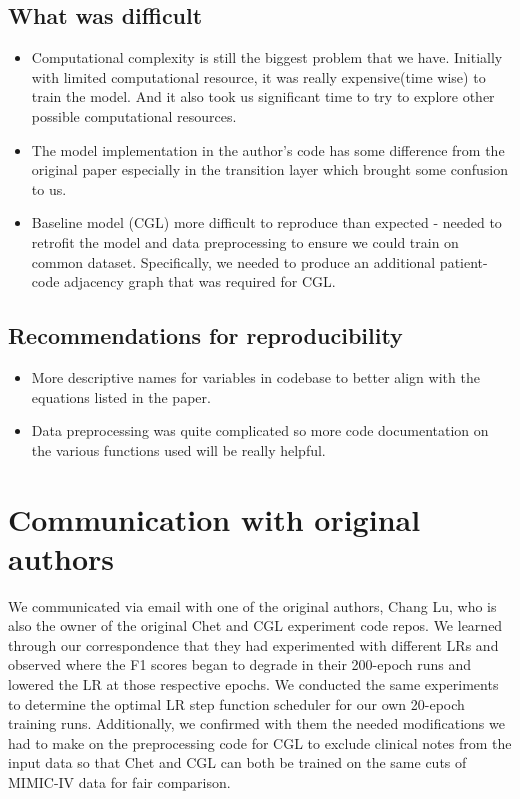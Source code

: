 \documentclass[11pt,a4paper,fleqn]{article}
\begin{document}
\subsection{What was difficult}
\begin{itemize}
    \item Computational complexity is still the biggest problem that we have. Initially with limited computational resource, it was really expensive(time wise) to train the model. And it also took us significant time to try to explore other possible computational resources.
    \item The model implementation in the author's code has some difference from the original paper especially in the transition layer which brought some confusion to us.
    \item Baseline model (CGL) more difficult to reproduce than expected - needed to retrofit the model and data preprocessing to ensure we could train on common dataset. Specifically, we needed to produce an additional patient-code adjacency graph that was required for CGL.
\end{itemize}

\subsection{Recommendations for reproducibility}
\begin{itemize}
    \item More descriptive names for variables in codebase to better align with the equations listed in the paper.
    \item Data preprocessing was quite complicated so more code documentation on the various functions used will be really helpful.
\end{itemize}

\section{Communication with original authors}
We communicated via email with one of the original authors, Chang Lu, who is
also the owner of the original Chet and CGL experiment code repos. We learned
through our correspondence that they had experimented with different LRs and
observed where the F1 scores began to degrade in their 200-epoch runs and
lowered the LR at those respective epochs. We conducted the same experiments to
determine the optimal LR step function scheduler for our own 20-epoch training
runs. Additionally, we confirmed with them the needed modifications we had to
make on the preprocessing code for CGL to exclude clinical notes from the input
data so that Chet and CGL can both be trained on the same cuts of MIMIC-IV data
for fair comparison.





\end{document}
